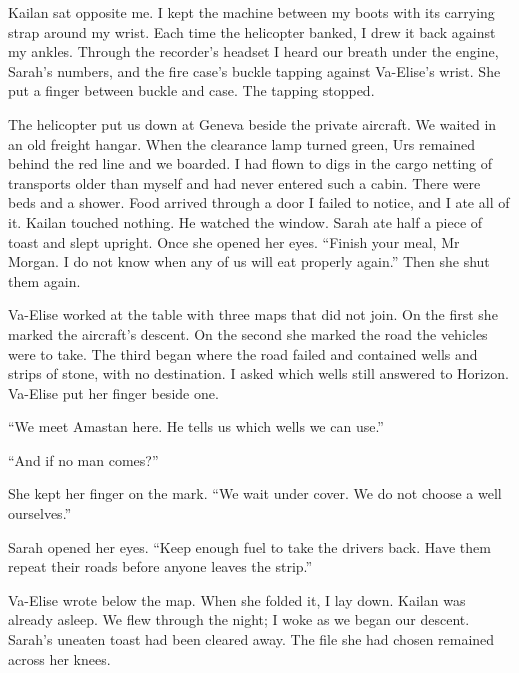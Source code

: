 Kailan sat opposite me. I kept the machine between my boots with its carrying strap around my wrist. Each time the helicopter banked, I drew it back against my ankles. Through the recorder's headset I heard our breath under the engine, Sarah's numbers, and the fire case's buckle tapping against Va-Elise's wrist. She put a finger between buckle and case. The tapping stopped.\par

The helicopter put us down at Geneva beside the private aircraft. We waited in an old freight hangar. When the clearance lamp turned green, Urs remained behind the red line and we boarded. I had flown to digs in the cargo netting of transports older than myself and had never entered such a cabin. There were beds and a shower. Food arrived through a door I failed to notice, and I ate all of it. Kailan touched nothing. He watched the window. Sarah ate half a piece of toast and slept upright. Once she opened her eyes. ``Finish your meal, Mr Morgan. I do not know when any of us will eat properly again.'' Then she shut them again.\par

Va-Elise worked at the table with three maps that did not join. On the first she marked the aircraft's descent. On the second she marked the road the vehicles were to take. The third began where the road failed and contained wells and strips of stone, with no destination. I asked which wells still answered to Horizon. Va-Elise put her finger beside one.\par

``We meet Amastan here. He tells us which wells we can use.''\par

``And if no man comes?''\par

She kept her finger on the mark. ``We wait under cover. We do not choose a well ourselves.''\par

Sarah opened her eyes. ``Keep enough fuel to take the drivers back. Have them repeat their roads before anyone leaves the strip.''\par

Va-Elise wrote below the map. When she folded it, I lay down. Kailan was already asleep. We flew through the night; I woke as we began our descent. Sarah's uneaten toast had been cleared away. The file she had chosen remained across her knees.\par

